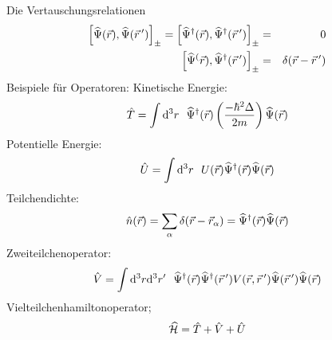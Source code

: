Die Vertauschungsrelationen
\begin{eqnarray*}
\left[\widehat\Psi(\vec r),\widehat\Psi(\vec r\,{'})\right]_\pm = \left[\widehat\Psi^\dagger(\vec r),\widehat\Psi^\dagger(\vec r\,{'})\right]_\pm &=& 0 
\\
\left[\widehat\Psi^(\vec r),\widehat\Psi^\dagger (\vec r\,{'})\right]_\pm &=& \delta(\vec r - \vec r\,{'})
\end{eqnarray*}
Beispiele für Operatoren:
Kinetische Energie:
\begin{eqnarray*} \hat T = \int \mathrm{d}^3r \ \ \widehat\Psi^\dagger (\vec r) \left ( \frac {-\hbar^2 \Delta}{2 m}\right) \widehat\Psi(\vec r)
\end{eqnarray*}
Potentielle Energie:
\begin{eqnarray*} \hat U = \int \mathrm{d}^3r \ \ U(\vec r) \widehat\Psi^ \dagger (\vec r)\widehat\Psi(\vec r)
\end{eqnarray*}
Teilchendichte:
\begin{eqnarray*}
\hat n (\vec r) = \sum \limits _\alpha \delta(\vec r - \vec r_\alpha) = \widehat\Psi^\dagger (\vec r)\widehat\Psi(\vec r)
\end{eqnarray*}
Zweiteilchenoperator:
\begin{eqnarray*}
\hat V = \int \mathrm{d}^3r \mathrm{d}^3r'\ \ \widehat\Psi^\dagger(\vec r)\widehat\Psi^\dagger (\vec r\,{'}) V(\vec r, \vec r\,{'}) \widehat\Psi(\vec r\,{'})\widehat\Psi(\vec r)
\end{eqnarray*}
Vielteilchenhamiltonoperator;
\begin{eqnarray*} \widehat {\mathcal H} = \hat T + \hat V + \hat U\end{eqnarray*}

